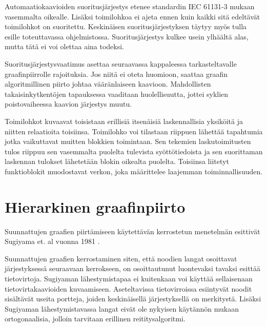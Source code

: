 \documentclass[finnish,12pt]{article}
\begin{document}
Automaatiokaavioiden suoritusjärjestys etenee standardin IEC 61131-3 mukaan
vasemmalta oikealle. Lisäksi toimilohkoa ei ajeta ennen kuin kaikki sitä edeltävät toimilohkot on suoritettu.
Keskinäisen suoritusjärjestyksen täytyy myös tulla esille toteuttavassa ohjelmistossa.
Suoritusjärjestys kulkee usein ylhäältä alas, mutta tätä ei voi olettaa aina todeksi.

Suoritusjärjestysvaatimus asettaa seuraavassa kappaleessa tarkasteltavalle graafinpiirrolle rajoituksia.
Jos niitä ei oteta huomioon, saattaa graafin algoritmillinen piirto johtaa vääränlaiseen kaavioon.
Mahdollisten takaisinkytkentöjen tapauksessa vaaditaan huolellisuutta, jottei syklien poistovaiheessa kaavion järjestys muutu.

Toimilohkot kuvaavat toisistaan erillisiä itsenäisiä laskennallisia yksiköitä
ja niitten relaatioita toisiinsa. Toimilohko voi tilastaan riippuen lähettää
tapahtumia jotka vaikuttavat muitten blokkien toimintaan. Sen tekemien
laskutoimitusten tulos riippuu sen vasemmalta puolelta tulevista
syöttötiedoista ja sen suorittaman laskennan tulokset lähetetään blokin oikealta puolelta.
Toisiinsa liitetyt funktioblokit muodostavat verkon, joka määrittelee laajemman toiminnallisuuden.


	\clearpage
	\section{Hierarkinen graafinpiirto}
	

Suunnattujen graafien piirtämiseen käytettävän kerrostetun menetelmän
esittivät Sugiyama et. al vuonna 1981 \cite{RefWorks:9}.

Suunnattujen graafien kerrostaminen siten, että noodien langat osoittavat järjestyksessä seuraavaan kerrokseen,
on osoittautunut luontevaksi tavaksi esittää tietovirtoja. Sugiyaman lähestymistapaa ei kuitenkaan voi käyttää sellaisenaan tietovirtakaavioiden kuvaamiseen. Aseteltavissa tietovirroissa esiintyvät noodit sisältävät useita portteja, joiden keskinäisellä järjestyksellä on merkitystä. Lisäksi Sugiyaman lähestymistavassa langat eivät ole nykyisen käytännön mukaan ortogonaalisia, jolloin tarvitaan erillinen reititysalgoritmi.
\end{document}
